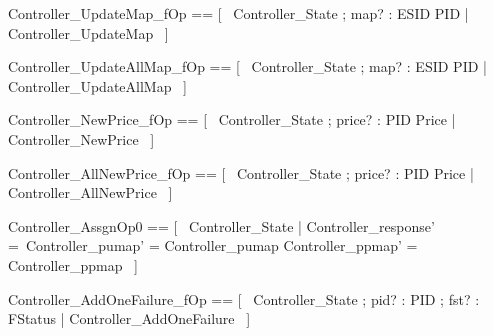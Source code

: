 \documentclass{article}
\begin{document}
\begin{zed}
	Controller\_UpdateMap\_fOp == [~  \Xi Controller\_State ; map? : ESID \pfun PID | \lnot \pre Controller\_UpdateMap  ~]
\end{zed}

\begin{zed}
	Controller\_UpdateAllMap\_fOp == [~  \Xi Controller\_State ; map? : ESID \pfun PID | \lnot \pre Controller\_UpdateAllMap  ~]
\end{zed}

\begin{zed}
	Controller\_NewPrice\_fOp == [~  \Xi Controller\_State ; price? : PID \pfun Price | \lnot \pre Controller\_NewPrice  ~]
\end{zed}

\begin{zed}
	Controller\_AllNewPrice\_fOp == [~  \Xi Controller\_State ; price? : PID \pfun Price | \lnot \pre Controller\_AllNewPrice  ~]
\end{zed}

\begin{zed}
	Controller\_AssgnOp0 == [~  \Delta Controller\_State | Controller\_response' =~\emptyset \land Controller\_pumap' = Controller\_pumap \land Controller\_ppmap' = Controller\_ppmap  ~]
\end{zed}

\begin{zed}
	Controller\_AddOneFailure\_fOp == [~  \Xi Controller\_State ; pid? : PID ; fst? : FStatus | \lnot \pre Controller\_AddOneFailure  ~]
\end{zed}
\end{document}
